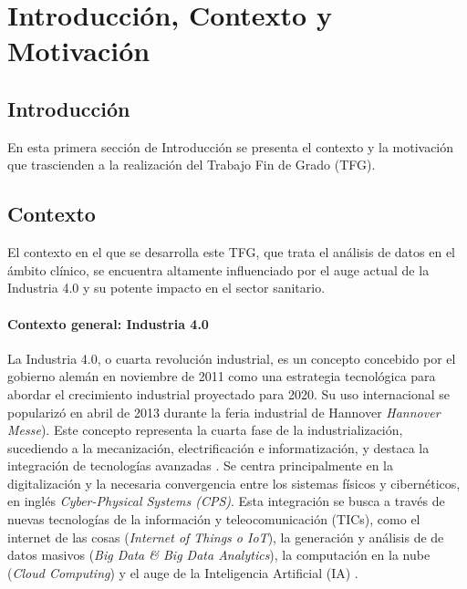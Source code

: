 \chapter{Introducción, Contexto y Motivación}\label{cap:introduccion}


\section{Introducción}


En esta primera sección de Introducción se presenta el contexto y la motivación que trascienden a la realización del Trabajo Fin de Grado (TFG).

\section{Contexto}
 
El contexto en el que se desarrolla este TFG, que trata el análisis de datos en el ámbito clínico, se encuentra altamente influenciado por el auge actual de la Industria 4.0 y su potente impacto en el sector sanitario.


\subsubsection{Contexto general: Industria 4.0}

La Industria 4.0, o cuarta revolución industrial, es un concepto concebido por el gobierno alemán en noviembre de 2011 como una estrategia tecnológica para abordar el crecimiento industrial proyectado para 2020. Su uso internacional se popularizó en abril de 2013 durante la feria industrial de Hannover \textit{Hannover Messe}). Este concepto representa la cuarta fase de la industrialización, sucediendo a la mecanización, electrificación e informatización, y destaca la integración de tecnologías avanzadas \cite{chen2020times}.
Se centra principalmente en la digitalización y la necesaria convergencia entre los sistemas físicos y cibernéticos, en inglés \textit{Cyber-Physical Systems (CPS)}. Esta integración se busca a través de nuevas tecnologías de la información y teleocomunicación (TICs), como el internet de las cosas (\textit{Internet of Things o IoT}), la generación y análisis de de datos masivos (\textit{Big Data \& Big Data Analytics}), la computación en la nube (\textit{Cloud Computing}) y el auge de la Inteligencia Artificial (IA) \cite{chen2020times}\cite{lasi2014industry}.


